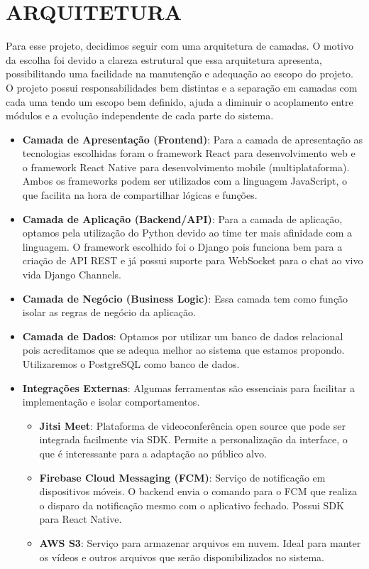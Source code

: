 \newpage
\section{ARQUITETURA}
Para esse projeto, decidimos seguir com uma arquitetura de camadas. O motivo da escolha foi devido a clareza estrutural que essa arquitetura apresenta, possibilitando uma facilidade na manutenção e adequação ao escopo do projeto.
O projeto possui responsabilidades bem distintas e a separação em camadas com cada uma tendo um escopo bem definido, ajuda a diminuir o acoplamento entre módulos e a evolução independente de cada parte do sistema.

\begin{itemize}
    \item \textbf{Camada de Apresentação (Frontend)}: Para a camada de apresentação as tecnologias escolhidas foram o framework React para desenvolvimento web e o framework React Native para desenvolvimento mobile (multiplataforma). Ambos os frameworks podem ser utilizados com a linguagem JavaScript, o que facilita na hora de compartilhar lógicas e funções.
    \item \textbf{Camada de Aplicação (Backend/API)}: Para a camada de aplicação, optamos pela utilização do Python devido ao time ter mais afinidade com a linguagem. O framework escolhido foi o Django pois funciona bem para a criação de API REST e já possui suporte para WebSocket para o chat ao vivo vida Django Channels.
    \item \textbf{Camada de Negócio (Business Logic)}: Essa camada tem como função isolar as regras de negócio da aplicação.
    \item \textbf{Camada de Dados}: Optamos por utilizar um banco de dados relacional pois acreditamos que se adequa melhor ao sistema que estamos propondo. Utilizaremos o PostgreSQL como banco de dados.
    \item \textbf{Integrações Externas}: Algumas ferramentas são essenciais para facilitar a implementação e isolar comportamentos.
        \begin{itemize}
            \item \textbf{Jitsi Meet}: Plataforma de videoconferência open source que pode ser integrada facilmente via SDK. Permite a personalização da interface, o que é interessante para a adaptação ao público alvo.
            \item \textbf{Firebase Cloud Messaging (FCM)}: Serviço de notificação em dispositivos móveis. O backend envia o comando para o FCM que realiza o disparo da notificação mesmo com o aplicativo fechado. Possui SDK para React Native.
            \item \textbf{AWS S3}: Serviço para armazenar arquivos em nuvem. Ideal para manter os vídeos e outros arquivos que serão disponibilizados no sistema.
        \end{itemize}
\end{itemize}